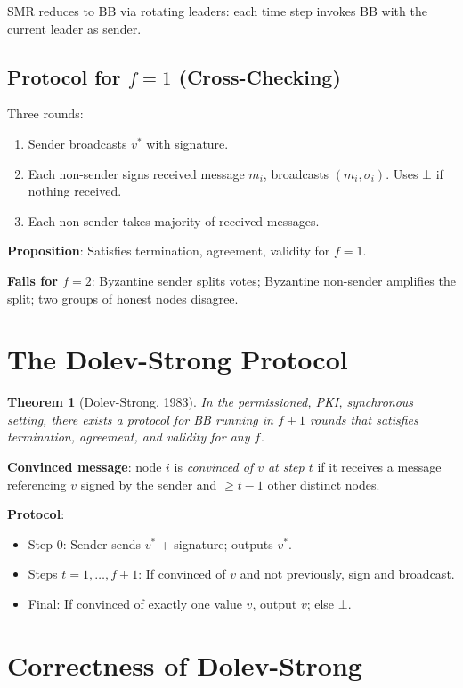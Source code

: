 \documentclass[12pt,a4paper,openany]{book}
\theoremstyle{definition}
\theoremstyle{plain}
\newtheorem{theorem}{Theorem}[chapter]
\theoremstyle{remark}
\begin{document}
SMR reduces to BB via rotating leaders: each time step invokes BB with
the current leader as sender.

\subsection{Protocol for $f=1$ (Cross-Checking)}

Three rounds:
\begin{enumerate}
  \item Sender broadcasts $v^*$ with signature.
  \item Each non-sender signs received message $m_i$, broadcasts $(m_i,\sigma_i)$.
        Uses $\bot$ if nothing received.
  \item Each non-sender takes majority of received messages.
\end{enumerate}

\textbf{Proposition}: Satisfies termination, agreement, validity for $f=1$.

\textbf{Fails for $f=2$}: Byzantine sender splits votes; Byzantine
non-sender amplifies the split; two groups of honest nodes disagree.

\section{The Dolev-Strong Protocol}

\begin{theorem}[Dolev-Strong, 1983]
  In the permissioned, PKI, synchronous setting, there exists a protocol
  for BB running in $f+1$ rounds that satisfies termination, agreement,
  and validity for any $f$.
\end{theorem}

\textbf{Convinced message}: node $i$ is \emph{convinced of $v$ at step
$t$} if it receives a message referencing $v$ signed by the sender and
$\geq t-1$ other distinct nodes.

\textbf{Protocol}:
\begin{itemize}
  \item Step 0: Sender sends $v^*$ + signature; outputs $v^*$.
  \item Steps $t=1,\ldots,f+1$: If convinced of $v$ and not previously,
        sign and broadcast.
  \item Final: If convinced of exactly one value $v$, output $v$; else $\bot$.
\end{itemize}

\section{Correctness of Dolev-Strong}
\end{document}
